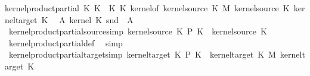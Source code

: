 \begin{isabellebody}
{{\isachardoublequoteopen}kernel{\isacharunderscore}{\kern0pt}product{\isacharunderscore}{\kern0pt}partial\ K{\isacharunderscore}{\kern0pt}{}\ K{\isacharunderscore}{\kern0pt}{}\ {\isasymequiv}\ K{\isacharunderscore}{\kern0pt}{}\ {\isasymOtimes}\isactrlsub K\ {\isacharparenleft}{\kern0pt}kernel{\isacharunderscore}{\kern0pt}of\ {\isacharparenleft}{\kern0pt}kernel{\isacharunderscore}{\kern0pt}source\ K{\isacharunderscore}{\kern0pt}{}\ {\isasymOtimes}\isactrlsub M\ kernel{\isacharunderscore}{\kern0pt}source\ K{\isacharunderscore}{\kern0pt}{}{\isacharparenright}{\kern0pt}\ {\isacharparenleft}{\kern0pt}kernel{\isacharunderscore}{\kern0pt}target\ K{\isacharunderscore}{\kern0pt}{}{\isacharparenright}{\kern0pt}\isanewline
\ {\isacharparenleft}{\kern0pt}{\isasymlambda}{\isasymomega}\ A\ kernel\ K{\isacharunderscore}{\kern0pt}{}\ {\isacharparenleft}{\kern0pt}snd\ {\isasymomega}{\isacharparenright}{\kern0pt}\ A%
}%
\isamarkupfalse%
\ kernel{\isacharunderscore}{\kern0pt}product{\isacharunderscore}{\kern0pt}partial{\isacharunderscore}{\kern0pt}source{\isacharbrackleft}{\kern0pt}simp{\isacharbrackright}{\kern0pt}{\isacharcolon}{\kern0pt}\ {\isachardoublequoteopen}kernel{\isacharunderscore}{\kern0pt}source\ {\isacharparenleft}{\kern0pt}K{\isacharunderscore}{\kern0pt}{}\ {\isasymOtimes}\isactrlsub P\ K{\isacharunderscore}{\kern0pt}{}{\isacharparenright}{\kern0pt}\ {\isacharequal}{\kern0pt}\ kernel{\isacharunderscore}{\kern0pt}source\ K{\isacharunderscore}{\kern0pt}{}{\isachardoublequoteclose}\isanewline
%
\isadelimproof
\ \ %
\endisadelimproof
%
\isatagproof
{}\isamarkupfalse%
\ kernel{\isacharunderscore}{\kern0pt}product{\isacharunderscore}{\kern0pt}partial{\isacharunderscore}{\kern0pt}def\ \isamarkupfalse%
\ simp%
\endisatagproof
{\isafoldproof}%
%
\isadelimproof
\isanewline
%
\endisadelimproof
\isanewline
{}\isamarkupfalse%
\ kernel{\isacharunderscore}{\kern0pt}product{\isacharunderscore}{\kern0pt}partial{\isacharunderscore}{\kern0pt}target{\isacharbrackleft}{\kern0pt}simp{\isacharbrackright}{\kern0pt}{\isacharcolon}{\kern0pt}\ {\isachardoublequoteopen}kernel{\isacharunderscore}{\kern0pt}target\ {\isacharparenleft}{\kern0pt}K{\isacharunderscore}{\kern0pt}{}\ {\isasymOtimes}\isactrlsub P\ K{\isacharunderscore}{\kern0pt}{}{\isacharparenright}{\kern0pt}\ {\isacharequal}{\kern0pt}\ {\isacharparenleft}{\kern0pt}kernel{\isacharunderscore}{\kern0pt}target\ K{\isacharunderscore}{\kern0pt}{}\ {\isasymOtimes}\isactrlsub M\ kernel{\isacharunderscore}{\kern0pt}target\ K{\isacharunderscore}{\kern0pt}{}{\isacharparenright}{\kern0pt}{\isachardoublequoteclose}\isanewline

\end{isabellebody}
